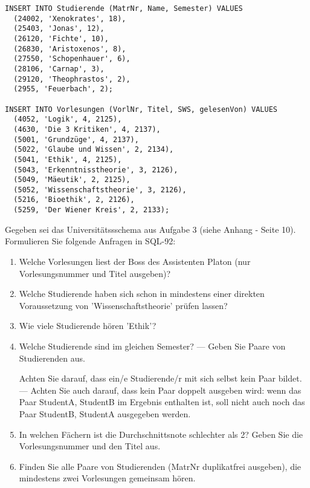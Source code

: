 \documentclass{lehramt-informatik-aufgabe}
\begin{document}
\begin{verbatim}
INSERT INTO Studierende (MatrNr, Name, Semester) VALUES
  (24002, 'Xenokrates', 18),
  (25403, 'Jonas', 12),
  (26120, 'Fichte', 10),
  (26830, 'Aristoxenos', 8),
  (27550, 'Schopenhauer', 6),
  (28106, 'Carnap', 3),
  (29120, 'Theophrastos', 2),
  (2955, 'Feuerbach', 2);

INSERT INTO Vorlesungen (VorlNr, Titel, SWS, gelesenVon) VALUES
  (4052, 'Logik', 4, 2125),
  (4630, 'Die 3 Kritiken', 4, 2137),
  (5001, 'Grundzüge', 4, 2137),
  (5022, 'Glaube und Wissen', 2, 2134),
  (5041, 'Ethik', 4, 2125),
  (5043, 'Erkenntnisstheorie', 3, 2126),
  (5049, 'Mäeutik', 2, 2125),
  (5052, 'Wissenschaftstheorie', 3, 2126),
  (5216, 'Bioethik', 2, 2126),
  (5259, 'Der Wiener Kreis', 2, 2133);
\end{verbatim}

Gegeben sei das Universitätssschema aus Aufgabe 3 (siehe Anhang - Seite
10). Formulieren Sie folgende Anfragen in SQL-92:

\begin{enumerate}

%

\item Welche Vorlesungen liest der Boss des Assistenten Platon (nur
Vorlesungsnummer und Titel ausgeben)?

%

\item Welche Studierende haben sich schon in mindestens einer direkten
Voraussetzung von ’Wissenschaftstheorie’ prüfen lassen?

%

\item Wie viele Studierende hören ’Ethik’?

%

\item Welche Studierende sind im gleichen Semester? — Geben Sie Paare
von Studierenden aus.

Achten Sie darauf, dass ein/e Studierende/r mit sich selbst kein Paar
bildet. — Achten Sie auch darauf, dass kein Paar doppelt ausgeben wird:
wenn das Paar StudentA, StudentB im Ergebnis enthalten ist, soll nicht
auch noch das Paar StudentB, StudentA ausgegeben werden.

%

\item In welchen Fächern ist die Durchschnittsnote schlechter als 2?
Geben Sie die Vorlesungsnummer und den Titel aus.

%

\item Finden Sie alle Paare von Studierenden (MatrNr duplikatfrei
ausgeben), die mindestens zwei Vorlesungen gemeinsam hören.

\end{enumerate}
\end{document}
